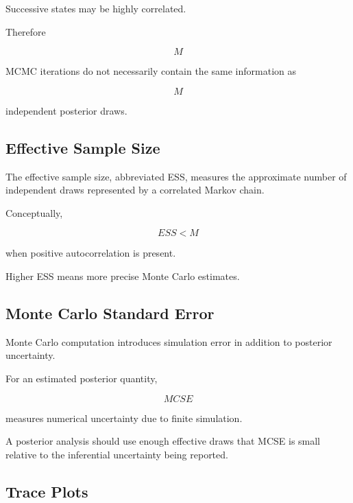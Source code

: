 Successive states may be highly correlated.

Therefore

\[
M
\]

MCMC iterations do not necessarily contain the same information as

\[
M
\]

independent posterior draws.

\subsection{Effective Sample Size}
\label{subsec:mcmc-effective-sample-size}

The effective sample size, abbreviated ESS, measures the approximate
number of independent draws represented by a correlated Markov chain.

Conceptually,

\[
\boxed{
ESS
<
M
}
\]

when positive autocorrelation is present.

Higher ESS means more precise Monte Carlo estimates.

\subsection{Monte Carlo Standard Error}
\label{subsec:monte-carlo-standard-error}

Monte Carlo computation introduces simulation error in addition to
posterior uncertainty.

For an estimated posterior quantity,

\[
\boxed{
MCSE
}
\]

measures numerical uncertainty due to finite simulation.

A posterior analysis should use enough effective draws that MCSE is small
relative to the inferential uncertainty being reported.

\subsection{Trace Plots}
\label{subsec:mcmc-trace-plots}

